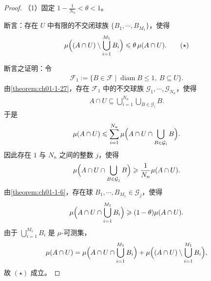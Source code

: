 \documentclass[../../main.tex]{subfiles}%
\begin{document}
\begin{proof}
（1）固定 $1-\frac{1}{N_n}<\theta<1$。

断言：存在 $U$ 中有限的不交闭球族 $\{B_1,\cdots,B_{M_1}\}$，使得
\begin{align*}
\mu\Bigl((A\cap U)\setminus\bigcup_{i=1}^{M_1}B_i\Bigr)\leqslant\theta\,\mu(A\cap U). \qquad(\star)
\end{align*}

断言之证明：令
\begin{align*}
\mathcal{F}_1:=\{B\in\mathcal{F}\mid \operatorname{diam}B\leqslant1,\ B\subseteq U\}.
\end{align*}
由\cref{theorem:ch01-1-27}，存在 $\mathcal{F}_1$ 中的不交球族 $\mathcal{G}_1,\cdots,\mathcal{G}_{N_n}$，使得%
\begin{align*}
A\cap U\subseteq\bigcup_{i=1}^{N_n}\bigcup_{B\in\mathcal{G}_i}B .
\end{align*}
于是
\begin{align*}
\mu(A\cap U)\leqslant\sum_{i=1}^{N_n}\mu\Bigl(A\cap U\cap\bigcup_{B\in\mathcal{G}_i}B\Bigr).
\end{align*}
因此存在 $1$ 与 $N_n$ 之间的整数 $j$，使得
\begin{align*}
\mu\Bigl(A\cap U\cap\bigcup_{B\in\mathcal{G}_j}B\Bigr)\geqslant\frac{1}{N_n}\mu(A\cap U).
\end{align*}
由\cref{theorem:ch01-1-6}，存在球 $B_1,\cdots,B_{M_1}\in\mathcal{G}_j$，使得%
\begin{align*}
\mu\Bigl(A\cap U\cap\bigcup_{i=1}^{M_1}B_i\Bigr)\geqslant(1-\theta)\mu(A\cap U).
\end{align*}
由于 $\bigcup_{i=1}^{M_1}B_i$ 是 $\mu$-可测集，
\begin{align*}
\mu(A\cap U)=\mu\Bigl(A\cap U\cap\bigcup_{i=1}^{M_1}B_i\Bigr)+\mu\Bigl((A\cap U)\setminus\bigcup_{i=1}^{M_1}B_i\Bigr),
\end{align*}
故 $(\star)$ 成立。


\end{proof}
\end{document}
